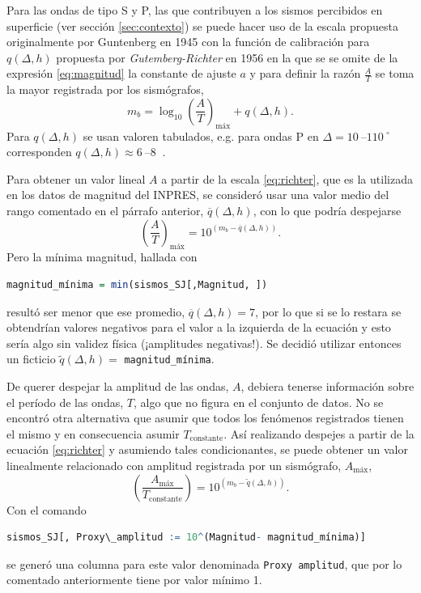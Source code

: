 \documentclass[a4paper]{report}
\begin{document}
Para las ondas de tipo S y P, las que contribuyen a los sismos percibidos en superficie (ver sección \ref{sec:contexto}) se puede hacer uso de la escala propuesta originalmente por Guntenberg en 1945 con la función de calibración para \(q(\Delta, h)\) propuesta por \emph{Gutemberg-Richter} en 1956 \cite[ecuación 4.18]{fowler_solid_1990} en la que se se omite de la expresión \ref{eq:magnitud} la constante de ajuste \(a\) y para definir la razón \(\frac{A}{T}\) se toma la mayor registrada por los sismógrafos,
\begin{equation}
	m_b = \log_{10} \left( \frac{A}{T} \right)_\text{máx} + q(\Delta, h).
	\label{eq:richter}
\end{equation}
Para \(q(\Delta, h)\) se usan valoren tabulados, e.g. para ondas P en \(\Delta = \SIrange{10}{110}{} ^\circ\) corresponden \(q(\Delta, h) \approx \SIrange{6}{8}{}\) \cite{willian_l_ellsworth_earthquake_1991}.

Para obtener un valor lineal \(A\) a partir de la escala \ref{eq:richter}, que es la utilizada en los datos de magnitud del INPRES, se consideró usar una valor medio del rango comentado en el párrafo anterior, \(\overline{q}(\Delta,h)\), con lo que podría despejarse
\begin{equation}
	\left( \frac{A}{T} \right)_\text{máx} = 10^{(m_b - \overline{q}(\Delta,h) )}.
	\label{eq:linealizacionMagnitud}
\end{equation}
Pero la mínima magnitud, hallada con
\begin{lstlisting}[breaklines=true, language=R]
	magnitud_mínima = min(sismos_SJ[,Magnitud, ])
\end{lstlisting}	
resultó ser menor que ese promedio, \(\overline{q}(\Delta,h) = 7\), por lo que si se lo restara se obtendrían valores negativos para el valor a la izquierda de la ecuación y esto sería algo sin validez física (¡amplitudes negativas!).
Se decidió utilizar entonces un ficticio \(\tilde{q}(\Delta,h) = \) \lstinline[language = R]'magnitud_mínima'.  

De querer despejar la amplitud de las ondas, \(A\), debiera tenerse información sobre el período de las ondas, \(T\), algo que no figura en el conjunto de datos.
No se encontró otra alternativa que asumir que todos los fenómenos registrados tienen el mismo y en consecuencia asumir \(T_\text{constante}\).
Así realizando despejes a partir de la ecuación \ref{eq:richter} y asumiendo tales condicionantes, se puede obtener un valor linealmente relacionado con amplitud registrada por un sismógrafo, \(A_\text{máx}\),
\begin{equation}
	\left( \frac{A_\text{máx}}{T_\text{constante}} \right) = 10^{(m_b - \tilde{q}(\Delta, h))}.
	\label{eq:linealizacionMagnitud_final} 
\end{equation}
Con el comando
\begin{lstlisting}[breaklines=true, language=R]
sismos_SJ[, Proxy\_amplitud := 10^(Magnitud- magnitud_mínima)]
\end{lstlisting}
se generó una columna para este valor denominada \lstinline[language = R]'Proxy amplitud', que por lo comentado anteriormente tiene por valor mínimo \num{1}. 
\end{document}
